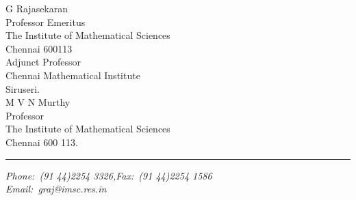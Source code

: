 \begin{flushleft}
G Rajasekaran\\
Professor Emeritus\\
The Institute of Mathematical Sciences\\
Chennai 600113\\
Adjunct Professor\\
Chennai Mathematical Institute\\
Siruseri.\\
\vskip 1cm 
M V N Murthy\\
Professor\\
The Institute of Mathematical Sciences\\
Chennai 600 113.\\
\end{flushleft}

\vfill

\hrule
\begin{flushleft}
{\sl Phone:~(91 44)2254 3326,\hfill Fax:~(91 44)2254 1586}\\
{\sl Email:~graj@imsc.res.in} 
\end{flushleft}

%



